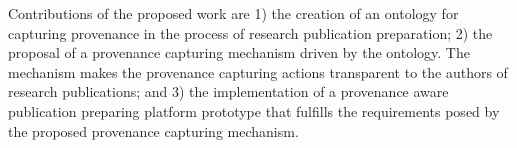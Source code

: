 Contributions of the proposed work are 1) the creation of an ontology for capturing provenance in the process of research publication preparation; 2) the proposal of a provenance capturing mechanism driven by the ontology. The mechanism makes the provenance capturing actions transparent to the authors of research publications; and 3) the implementation of a provenance aware publication preparing platform prototype that fulfills the requirements posed by the proposed provenance capturing mechanism.

%
%
%
%
